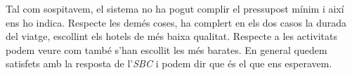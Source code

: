 \documentclass[11pt,a4paper]{article}
\begin{document}
Tal com sospitavem, el sistema no ha pogut complir el pressupost mínim i així ens ho indica. Respecte les demés coses, ha complert en els dos casos la durada del viatge, escollint els hotels de més baixa qualitat. Respecte a les activitats podem veure com també s'han escollit les més barates. En general quedem satisfets amb la resposta de l'\emph{SBC} i podem dir que és el que ens esperavem.
\end{document}
